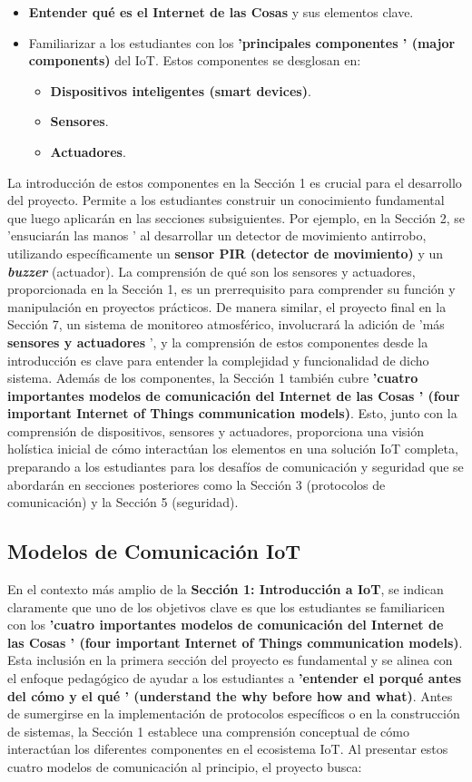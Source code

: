 \documentclass{report}
\begin{document}
\begin{itemize}
    \item \textbf{Entender qué es el Internet de las Cosas} y sus elementos clave.
    \item Familiarizar a los estudiantes con los \textbf{ 'principales componentes ' (major components)} del IoT. Estos componentes se desglosan en:
    \begin{itemize}
        \item \textbf{Dispositivos inteligentes (smart devices)}.
        \item \textbf{Sensores}.
        \item \textbf{Actuadores}.
    \end{itemize}
\end{itemize}
La introducción de estos componentes en la Sección 1 es crucial para el desarrollo del proyecto. Permite a los estudiantes construir un conocimiento 
fundamental que luego aplicarán en las secciones subsiguientes. Por ejemplo, en la Sección 2, se  'ensuciarán las manos ' al desarrollar un detector de 
movimiento antirrobo, utilizando específicamente un \textbf{sensor PIR (detector de movimiento)} y un \textbf{\textit{buzzer}} (actuador). La comprensión 
de qué son los sensores y actuadores, proporcionada en la Sección 1, es un prerrequisito para comprender su función y manipulación en proyectos prácticos. 
De manera similar, el proyecto final en la Sección 7, un sistema de monitoreo atmosférico, involucrará la adición de  'más \textbf{sensores y actuadores} ', 
y la comprensión de estos componentes desde la introducción es clave para entender la complejidad y funcionalidad de dicho sistema. Además de los componentes, 
la Sección 1 también cubre \textbf{ 'cuatro importantes modelos de comunicación del Internet de las Cosas ' (four important Internet of Things communication 
models)}. Esto, junto con la comprensión de dispositivos, sensores y actuadores, proporciona una visión holística inicial de cómo interactúan los 
elementos en una solución IoT completa, preparando a los estudiantes para los desafíos de comunicación y seguridad que se abordarán en secciones 
posteriores como la Sección 3 (protocolos de comunicación) y la Sección 5 (seguridad).

\subsection{Modelos de Comunicación IoT}
En el contexto más amplio de la \textbf{Sección 1: Introducción a IoT}, se  indican claramente que uno de los objetivos clave es que los estudiantes 
se familiaricen con los \textbf{ 'cuatro importantes modelos de comunicación del Internet de las Cosas ' (four important Internet of Things communication 
models)}. Esta inclusión en la primera sección del proyecto es fundamental y se alinea con el enfoque pedagógico de ayudar a los estudiantes a 
\textbf{'entender el porqué antes del cómo y el qué ' (understand the why before how and what)}. Antes de sumergirse en la implementación de protocolos 
específicos o en la construcción de sistemas, la Sección 1 establece una comprensión conceptual de cómo interactúan los diferentes componentes en el 
ecosistema IoT. Al presentar estos cuatro modelos de comunicación al principio, el proyecto busca:
\end{document}
